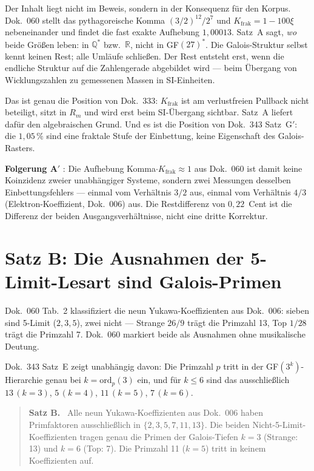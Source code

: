 Der Inhalt liegt nicht im Beweis, sondern in der Konsequenz für den
Korpus. Dok.~060 stellt das pythagoreische Komma $(3/2)^{12}/2^7$ und
$K_\text{frak}=1-100\xi$ nebeneinander und findet die fast exakte
Aufhebung $1{,}00013$. Satz~A sagt, \emph{wo} beide Größen leben: in
$\mathbb{Q}^*$ bzw.\ $\mathbb{R}$, nicht in GF$(27)^*$. Die
Galois-Struktur selbst kennt keinen Rest; alle Umläufe schließen. Der
Rest entsteht erst, wenn die endliche Struktur auf die Zahlengerade
abgebildet wird --- beim Übergang von Wicklungszahlen zu gemessenen
Massen in SI-Einheiten.

Das ist genau die Position von Dok.~333: $K_\text{frak}$ ist am
verlustfreien Pullback nicht beteiligt, sitzt in $R_m$ und wird erst
beim SI-Übergang sichtbar. Satz~A liefert dafür den algebraischen Grund.
Und es ist die Position von Dok.~343 Satz~G$'$: die $1{,}05\,\%$ sind
eine fraktale Stufe der Einbettung, keine Eigenschaft des Galois-Rasters.

\textbf{Folgerung A$'$} \KM: Die Aufhebung Komma$\cdot K_\text{frak}\approx1$
aus Dok.~060 ist damit keine Koinzidenz zweier unabhängiger Systeme,
sondern zwei Messungen desselben Einbettungsfehlers --- einmal vom
Verhältnis $3/2$ aus, einmal vom Verhältnis $4/3$ (Elektron-Koeffizient,
Dok.~006) aus. Die Restdifferenz von $0{,}22$~Cent ist die Differenz
der beiden Ausgangsverhältnisse, nicht eine dritte Korrektur.

\section{Satz B: Die Ausnahmen der 5-Limit-Lesart sind Galois-Primen}

Dok.~060 Tab.~2 klassifiziert die neun Yukawa-Koeffizienten aus Dok.~006:
sieben sind 5-Limit ($2,3,5$), zwei nicht --- Strange $26/9$ trägt die
Primzahl 13, Top $1/28$ trägt die Primzahl 7. Dok.~060 markiert beide
als Ausnahmen ohne musikalische Deutung.

Dok.~343 Satz~E zeigt unabhängig davon: Die Primzahl $p$ tritt in der
GF$(3^k)$-Hierarchie genau bei $k=\mathrm{ord}_p(3)$ ein, und für $k\le6$
sind das ausschließlich $13\,(k=3)$, $5\,(k=4)$, $11\,(k=5)$, $7\,(k=6)$.

\begin{quote}
\textbf{Satz B.} \BM\ Alle neun Yukawa-Koeffizienten aus Dok.~006 haben
Primfaktoren ausschließlich in $\{2,3,5,7,11,13\}$. Die beiden
Nicht-5-Limit-Koeffizienten tragen genau die Primen der Galois-Tiefen
$k=3$ (Strange: 13) und $k=6$ (Top: 7). Die Primzahl 11 ($k=5$) tritt
in keinem Koeffizienten auf.
\end{quote}

